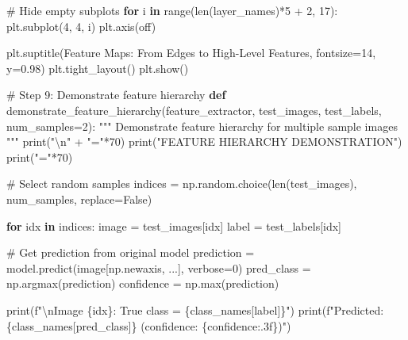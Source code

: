 \documentclass[
  letterpaper,
  DIV=11,
  numbers=noendperiod]{scrreprt}
\newenvironment{Shaded}{\begin{snugshade}}{\end{snugshade}}
\newcommand{\BuiltInTok}[1]{\textcolor[rgb]{0.00,0.23,0.31}{#1}}
\newcommand{\CharTok}[1]{\textcolor[rgb]{0.13,0.47,0.30}{#1}}
\newcommand{\CommentTok}[1]{\textcolor[rgb]{0.37,0.37,0.37}{#1}}
\newcommand{\ControlFlowTok}[1]{\textcolor[rgb]{0.00,0.23,0.31}{\textbf{#1}}}
\newcommand{\DecValTok}[1]{\textcolor[rgb]{0.68,0.00,0.00}{#1}}
\newcommand{\FloatTok}[1]{\textcolor[rgb]{0.68,0.00,0.00}{#1}}
\newcommand{\KeywordTok}[1]{\textcolor[rgb]{0.00,0.23,0.31}{\textbf{#1}}}
\newcommand{\NormalTok}[1]{\textcolor[rgb]{0.00,0.23,0.31}{#1}}
\newcommand{\OperatorTok}[1]{\textcolor[rgb]{0.37,0.37,0.37}{#1}}
\newcommand{\SpecialCharTok}[1]{\textcolor[rgb]{0.37,0.37,0.37}{#1}}
\newcommand{\SpecialStringTok}[1]{\textcolor[rgb]{0.13,0.47,0.30}{#1}}
\newcommand{\StringTok}[1]{\textcolor[rgb]{0.13,0.47,0.30}{#1}}
\newcommand{\VariableTok}[1]{\textcolor[rgb]{0.07,0.07,0.07}{#1}}
\begin{document}
\begin{Shaded}
\begin{Highlighting}[]
    \CommentTok{\# Hide empty subplots}
    \ControlFlowTok{for}\NormalTok{ i }\KeywordTok{in} \BuiltInTok{range}\NormalTok{(}\BuiltInTok{len}\NormalTok{(layer\_names)}\OperatorTok{*}\DecValTok{5} \OperatorTok{+} \DecValTok{2}\NormalTok{, }\DecValTok{17}\NormalTok{):}
\NormalTok{        plt.subplot(}\DecValTok{4}\NormalTok{, }\DecValTok{4}\NormalTok{, i)}
\NormalTok{        plt.axis(}\StringTok{\textquotesingle{}off\textquotesingle{}}\NormalTok{)}
    
\NormalTok{    plt.suptitle(}\StringTok{\textquotesingle{}Feature Maps: From Edges to High{-}Level Features\textquotesingle{}}\NormalTok{, fontsize}\OperatorTok{=}\DecValTok{14}\NormalTok{, y}\OperatorTok{=}\FloatTok{0.98}\NormalTok{)}
\NormalTok{    plt.tight\_layout()}
\NormalTok{    plt.show()}

\CommentTok{\# Step 9: Demonstrate feature hierarchy}
\KeywordTok{def}\NormalTok{ demonstrate\_feature\_hierarchy(feature\_extractor, test\_images, test\_labels, num\_samples}\OperatorTok{=}\DecValTok{2}\NormalTok{):}
    \CommentTok{"""}
\CommentTok{    Demonstrate feature hierarchy for multiple sample images}
\CommentTok{    """}
    \BuiltInTok{print}\NormalTok{(}\StringTok{"}\CharTok{\textbackslash{}n}\StringTok{"} \OperatorTok{+} \StringTok{"="}\OperatorTok{*}\DecValTok{70}\NormalTok{)}
    \BuiltInTok{print}\NormalTok{(}\StringTok{"FEATURE HIERARCHY DEMONSTRATION"}\NormalTok{)}
    \BuiltInTok{print}\NormalTok{(}\StringTok{"="}\OperatorTok{*}\DecValTok{70}\NormalTok{)}
    
    \CommentTok{\# Select random samples}
\NormalTok{    indices }\OperatorTok{=}\NormalTok{ np.random.choice(}\BuiltInTok{len}\NormalTok{(test\_images), num\_samples, replace}\OperatorTok{=}\VariableTok{False}\NormalTok{)}
    
    \ControlFlowTok{for}\NormalTok{ idx }\KeywordTok{in}\NormalTok{ indices:}
\NormalTok{        image }\OperatorTok{=}\NormalTok{ test\_images[idx]}
\NormalTok{        label }\OperatorTok{=}\NormalTok{ test\_labels[idx]}
        
        \CommentTok{\# Get prediction from original model}
\NormalTok{        prediction }\OperatorTok{=}\NormalTok{ model.predict(image[np.newaxis, ...], verbose}\OperatorTok{=}\DecValTok{0}\NormalTok{)}
\NormalTok{        pred\_class }\OperatorTok{=}\NormalTok{ np.argmax(prediction)}
\NormalTok{        confidence }\OperatorTok{=}\NormalTok{ np.}\BuiltInTok{max}\NormalTok{(prediction)}
        
        \BuiltInTok{print}\NormalTok{(}\SpecialStringTok{f"}\CharTok{\textbackslash{}n}\SpecialStringTok{Image }\SpecialCharTok{\{}\NormalTok{idx}\SpecialCharTok{\}}\SpecialStringTok{: True class = }\SpecialCharTok{\{}\NormalTok{class\_names[label]}\SpecialCharTok{\}}\SpecialStringTok{"}\NormalTok{)}
        \BuiltInTok{print}\NormalTok{(}\SpecialStringTok{f"Predicted: }\SpecialCharTok{\{}\NormalTok{class\_names[pred\_class]}\SpecialCharTok{\}}\SpecialStringTok{ (confidence: }\SpecialCharTok{\{}\NormalTok{confidence}\SpecialCharTok{:.3f\}}\SpecialStringTok{)"}\NormalTok{)}
        

\end{Highlighting}
\end{Shaded}
\end{document}
